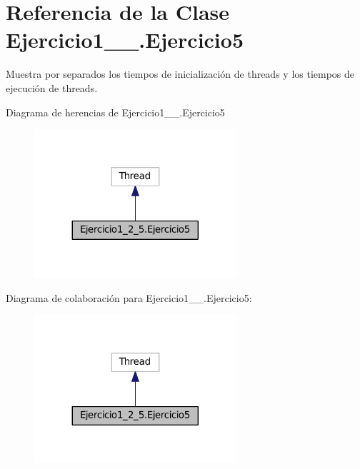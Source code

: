 \hypertarget{class_ejercicio1__2__5_1_1_ejercicio5}{}\section{Referencia de la Clase Ejercicio1\+\_\+\_.\+Ejercicio5}
\label{class_ejercicio1__2__5_1_1_ejercicio5}


Muestra por separados los tiempos de inicialización de threads y los tiempos de ejecución de threads.  




Diagrama de herencias de Ejercicio1\+\_\+\_.\+Ejercicio5
\nopagebreak
\begin{figure}[H]
\begin{center}
\leavevmode
\includegraphics[width=212pt]{class_ejercicio1__2__5_1_1_ejercicio5__inherit__graph}
\end{center}
\end{figure}


Diagrama de colaboración para Ejercicio1\+\_\+\_.\+Ejercicio5\+:
\nopagebreak
\begin{figure}[H]
\begin{center}
\leavevmode
\includegraphics[width=212pt]{class_ejercicio1__2__5_1_1_ejercicio5__coll__graph}
\end{center}
\end{figure}

